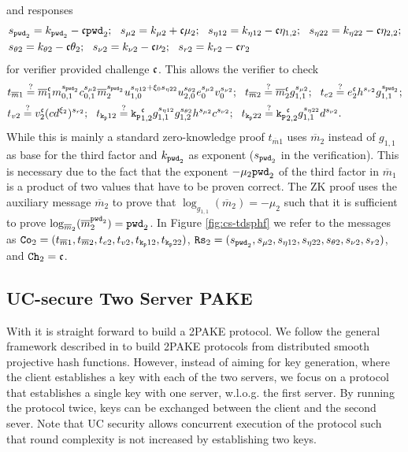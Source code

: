 and responses
\begin{align*}
  & s_{\mathtt{pwd}_2} = k_{\mathtt{pwd}_2} - \mathfrak{c}\mathtt{pwd}_2; ~~ s_{\mu2} = k_{\mu2} + \mathfrak{c}\mu_2; ~~ s_{\eta12} = k_{\eta12} - \mathfrak{c}\eta_{1,2}; ~~ s_{\eta22} = k_{\eta22} - \mathfrak{c}\eta_{2,2}; \\
  & s_{\theta2} = k_{\theta2} - \mathfrak{c}\theta_2; ~~ s_{\nu2} = k_{\nu2} - \mathfrak{c}\nu_2; ~~ s_{r2} = k_{r2} - \mathfrak{c} r_2
\end{align*}
for verifier provided challenge $\mathfrak{c}$.
This allows the verifier to check
\begin{align*}
  & t_{\overline{m}1} \stackrel{?}{=} \overline{m}_1^\mathfrak{c} m_{0,1}^{s_{\mathtt{pwd}_2}} c_{0,1}^{s_{\mu2}} \overline{m}_{2}^{s_{\mathtt{pwd}_2}} u_{1,0}^{s_{\eta12} + \xi_0 s_{\eta22}} u_{2,0}^{s_{\theta2}} e_0^{s_{\mu2}} v_0^{s_{\nu2}}; ~~ 
    t_{\overline{m}2} \stackrel{?}{=} \overline{m}_2^\mathfrak{c} g_{1,1}^{s_{\mu2}}; ~~  t_{e2} \stackrel{?}{=} e_2^\mathfrak{c} h^{s_{r2}}g_{1,1}^{s_{\mathtt{pwd}_2}}; \\
  & t_{v2} \stackrel{?}{=} v_2^\mathfrak{c} (cd^{\xi_2})^{s_{r2}}; ~~
    t_{\mathtt{k_p}12} \stackrel{?}{=} \mathtt{k_p}_{1,2}^\mathfrak{c} g_{1,1}^{s_{\eta12}} g_{1,2}^{s_{\theta2}} h^{s_{\mu2}} c^{s_{\nu2}}; ~~ 
    t_{\mathtt{k_p}22} \stackrel{?}{=} \mathtt{k_p}_{2,2}^\mathfrak{c} g_{1,1}^{s_{\eta22}} d^{s_{\nu2}} .
\end{align*}
While this is mainly a standard zero-knowledge proof $t_{\overline{m}1}$ uses $\overline{m}_2$ instead of $g_{1,1}$ as base for the third factor and $k_{\mathtt{pwd}_2}$ as exponent ($s_{\mathtt{pwd}_2}$ in the verification).
This is necessary due to the fact that the exponent $-\mu_2 {\mathtt{pwd}_2}$ of the third factor in $\overline{m}_1$ is a product of two values that have to be proven correct.
The ZK proof uses the auxiliary message $\overline{m}_2$ to prove that $\log_{g_{1,1}}(\overline{m}_2)=-\mu_2$ such that it is sufficient to prove $\log_{\overline{m}_2}(\overline{m}_2^{{\mathtt{pwd}_2}})={\mathtt{pwd}_2}$.
In Figure \ref{fig:cs-tdsphf} we refer to the messages as $\mathtt{Co}_{2}=(t_{\overline{m}1}, t_{\overline{m}2}, t_{e2}, t_{v2}, t_{\mathtt{k_p}12}, t_{\mathtt{k_p}22})$, $\mathtt{Rs}_{2}=(s_{\mathtt{pwd}_2}, s_{\mu2}, s_{\eta12}, s_{\eta22}, s_{\theta2}, s_{\nu2}, s_{r2})$, and $\mathtt{Ch}_{2}=\mathfrak{c}$.


\subsection{UC-secure Two Server PAKE}\label{sec:2pake}
With \TDSPHF it is straight forward to build a 2PAKE protocol.
We follow the general framework described in \cite{KieferM14a} to build 2PAKE protocols from distributed smooth projective hash functions.
However, instead of aiming for key generation, where the client establishes a key with each of the two servers, we focus on a protocol that establishes a single key with one server, w.l.o.g. the first server.
By running the protocol twice, keys can be exchanged between the client and the second sever.
Note that UC security allows concurrent execution of the protocol such that round complexity is not increased by establishing two keys.

